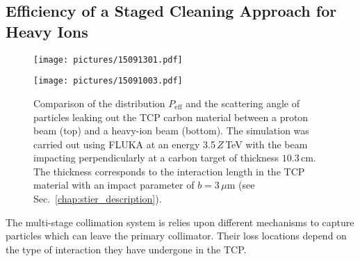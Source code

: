 \subsection{Efficiency of a Staged Cleaning Approach for Heavy Ions}

 \begin{figure}[b]
   \begin{minipage}[t]{0.5\textwidth}
     \texttt{[image: pictures/15091301.pdf]}
   \end{minipage}
   \begin{minipage}[t]{0.5\textwidth}
     \texttt{[image: pictures/15091003.pdf]}
   \end{minipage}
   \caption{Comparison of the distribution $P_\text{eff}$ and the scattering angle of particles leaking out the TCP carbon material between a proton beam (top) and a heavy-ion beam (bottom). The simulation was carried out using FLUKA at an energy 3.5$\,Z\,$TeV with the beam impacting perpendicularly at a carbon target of thickness $10.3\,$cm. The thickness corresponds to the interaction length in the TCP material with an impact parameter of $b=3\,\mu$m (see Sec.~\ref{chap:stier_description}).} %
   \label{fig:15022301}
 \end{figure}

The multi-stage collimation system is relies upon different mechanisms to capture particles which can leave the primary collimator. Their loss locations depend on the type of interaction they have undergone in the TCP. 

